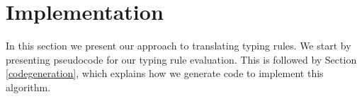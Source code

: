 \documentclass[nofilelist]{cslthse-msc}
\newcommand{\CR}[1]{\textcolor{green!60!black}{[\textbf{CR}:#1]}}
\begin{document}







\section{Implementation}\label{sectionimplementation} %

In this section we present our approach to translating typing rules.
We start by presenting pseudocode for our typing rule evaluation.
This is followed by Section \ref{codegeneration}, which explains how we generate  code to implement this algorithm.
\end{document}
